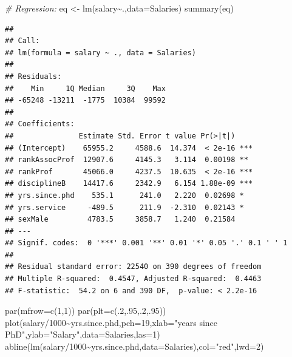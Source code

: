 \documentclass[
]{book}
\newenvironment{Shaded}{\begin{snugshade}}{\end{snugshade}}
\newcommand{\AttributeTok}[1]{\textcolor[rgb]{0.77,0.63,0.00}{#1}}
\newcommand{\CommentTok}[1]{\textcolor[rgb]{0.56,0.35,0.01}{\textit{#1}}}
\newcommand{\DecValTok}[1]{\textcolor[rgb]{0.00,0.00,0.81}{#1}}
\newcommand{\FunctionTok}[1]{\textcolor[rgb]{0.00,0.00,0.00}{#1}}
\newcommand{\NormalTok}[1]{#1}
\newcommand{\OtherTok}[1]{\textcolor[rgb]{0.56,0.35,0.01}{#1}}
\newcommand{\SpecialCharTok}[1]{\textcolor[rgb]{0.00,0.00,0.00}{#1}}
\newcommand{\StringTok}[1]{\textcolor[rgb]{0.31,0.60,0.02}{#1}}
\theoremstyle{definition}
\theoremstyle{definition}
\theoremstyle{definition}
\theoremstyle{definition}
\theoremstyle{remark}
\begin{document}
\begin{Shaded}
\begin{Highlighting}[]
\CommentTok{\# Regression:}
\NormalTok{eq }\OtherTok{\textless{}{-}} \FunctionTok{lm}\NormalTok{(salary}\SpecialCharTok{\textasciitilde{}}\NormalTok{.,}\AttributeTok{data=}\NormalTok{Salaries)}
\FunctionTok{summary}\NormalTok{(eq)}
\end{Highlighting}
\end{Shaded}

\begin{verbatim}
## 
## Call:
## lm(formula = salary ~ ., data = Salaries)
## 
## Residuals:
##    Min     1Q Median     3Q    Max 
## -65248 -13211  -1775  10384  99592 
## 
## Coefficients:
##               Estimate Std. Error t value Pr(>|t|)    
## (Intercept)    65955.2     4588.6  14.374  < 2e-16 ***
## rankAssocProf  12907.6     4145.3   3.114  0.00198 ** 
## rankProf       45066.0     4237.5  10.635  < 2e-16 ***
## disciplineB    14417.6     2342.9   6.154 1.88e-09 ***
## yrs.since.phd    535.1      241.0   2.220  0.02698 *  
## yrs.service     -489.5      211.9  -2.310  0.02143 *  
## sexMale         4783.5     3858.7   1.240  0.21584    
## ---
## Signif. codes:  0 '***' 0.001 '**' 0.01 '*' 0.05 '.' 0.1 ' ' 1
## 
## Residual standard error: 22540 on 390 degrees of freedom
## Multiple R-squared:  0.4547, Adjusted R-squared:  0.4463 
## F-statistic:  54.2 on 6 and 390 DF,  p-value: < 2.2e-16
\end{verbatim}

\begin{Shaded}
\begin{Highlighting}[]
\FunctionTok{par}\NormalTok{(}\AttributeTok{mfrow=}\FunctionTok{c}\NormalTok{(}\DecValTok{1}\NormalTok{,}\DecValTok{1}\NormalTok{))}
\FunctionTok{par}\NormalTok{(}\AttributeTok{plt=}\FunctionTok{c}\NormalTok{(.}\DecValTok{2}\NormalTok{,.}\DecValTok{95}\NormalTok{,.}\DecValTok{2}\NormalTok{,.}\DecValTok{95}\NormalTok{))}
\FunctionTok{plot}\NormalTok{(salary}\SpecialCharTok{/}\DecValTok{1000}\SpecialCharTok{\textasciitilde{}}\NormalTok{yrs.since.phd,}\AttributeTok{pch=}\DecValTok{19}\NormalTok{,}\AttributeTok{xlab=}\StringTok{"years since PhD"}\NormalTok{,}\AttributeTok{ylab=}\StringTok{"Salary"}\NormalTok{,}\AttributeTok{data=}\NormalTok{Salaries,}\AttributeTok{las=}\DecValTok{1}\NormalTok{)}
\FunctionTok{abline}\NormalTok{(}\FunctionTok{lm}\NormalTok{(salary}\SpecialCharTok{/}\DecValTok{1000}\SpecialCharTok{\textasciitilde{}}\NormalTok{yrs.since.phd,}\AttributeTok{data=}\NormalTok{Salaries),}\AttributeTok{col=}\StringTok{"red"}\NormalTok{,}\AttributeTok{lwd=}\DecValTok{2}\NormalTok{)}
\end{Highlighting}
\end{Shaded}
\end{document}
